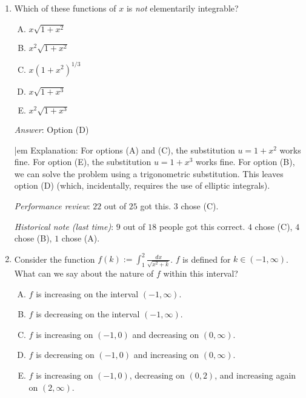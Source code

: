 \documentclass[10pt]{amsart}
\begin{document}
\begin{enumerate}
  {\em Answer}: Option (E)

  {\em Explanation}: Review the material on rational function
  integration.

  {\em Performance review}: $21$ out of $25$ got this. $2$ chose (D),
  $1$ each chose (B) and (C).

  {\em Historical note (last time)}: $3$ out of $18$ people got this
  correct. $7$ chose (C), $6$ chose (D), $1$ each chose (A) and (B).

\item Which of these functions of $x$ is {\em not} elementarily
  integrable?

  \begin{enumerate}[(A)]
  \item $x\sqrt{1 + x^2}$
  \item $x^2\sqrt{1 + x^2}$
  \item $x(1 + x^2)^{1/3}$
  \item $x\sqrt{1 + x^3}$
  \item $x^2\sqrt{1 + x^3}$
  \end{enumerate}

  {\em Answer}: Option (D)

  {|em Explanation}: For options (A) and (C), the substitution $u = 1
  + x^2$ works fine. For option (E), the substitution $u = 1 + x^3$
  works fine. For option (B), we can solve the problem using a
  trigonometric substitution. This leaves option (D) (which,
  incidentally, requires the use of elliptic integrals).

  {\em Performance review}: $22$ out of $25$ got this. $3$ chose (C).

  {\em Historical note (last time)}: $9$ out of $18$ people got this
  correct. $4$ chose (C), $4$ chose (B), $1$ chose (A).


\item Consider the function $f(k) := \int_1^2 \frac{dx}{\sqrt{x^2 +
  k}}$. $f$ is defined for $k \in (-1,\infty)$. What can we say about
  the nature of $f$ within this interval?

  \begin{enumerate}[(A)]
  \item $f$ is increasing on the interval $(-1,\infty)$.
  \item $f$ is decreasing on the interval $(-1,\infty)$.
  \item $f$ is increasing on $(-1,0)$ and decreasing on $(0,\infty)$.
  \item $f$ is decreasing on $(-1,0)$ and increasing on $(0,\infty)$.
  \item $f$ is increasing on $(-1,0)$, decreasing on $(0,2)$, and
    increasing again on $(2,\infty)$.
  \end{enumerate}


\end{enumerate}
\end{document}
